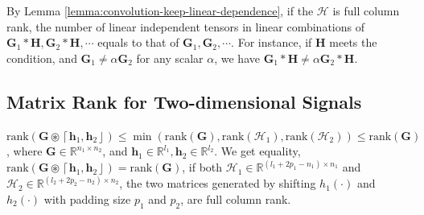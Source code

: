 \documentclass[twoside,11pt]{article}
\def\oconv{\circledast}
\def\rank{\text{rank}}
\def\tvar#1{\mathbf{#1}} %
\def\lcerfl#1{\left\lceil{#1}\right\rfloor}
\begin{document}
  By Lemma \ref{lemma:convolution-keep-linear-dependence}, if the \(\mathcal{H}\) is full column rank, the number of linear independent tensors in linear combinations of \(\tvar{G}_1 * \tvar{H}, \tvar{G}_2 * \tvar{H}, \cdots\) equals to that of \(\tvar{G}_1, \tvar{G}_2, \cdots\).
  For instance, if \(\tvar{H}\) meets the condition, and \(\tvar{G}_1 \ne \alpha \tvar{G}_2\) for any scalar \(\alpha\), we have \(\tvar{G}_1 * \tvar{H} \ne \alpha \tvar{G}_2 * \tvar{H}\).

\subsection{Matrix Rank for Two-dimensional Signals}
\label{subsec:matrix-rank-for-two-dimensional-signals}

\begin{lemma}
  \(\rank(\tvar{G} \oconv \lcerfl{\tvar{h}_1, \tvar{h}_2}) \le \min\left(\rank(\tvar{G}), \rank(\mathcal{H}_1), \rank(\mathcal{H}_2)\right) \le \rank(\tvar{G})\), where \(\tvar{G} \in \mathbb{R}^{n_1 \times n_2}\), and \(\tvar{h}_1 \in \mathbb{R}^{l_1}, \tvar{h}_2 \in \mathbb{R}^{l_2}\).
    We get equality, \(\rank(\tvar{G} \oconv \lcerfl{\tvar{h}_1, \tvar{h}_2}) = \rank(\tvar{G})\), if both \(\mathcal{H}_1 \in \mathbb{R}^{(l_1 + 2p_1 -n_1) \times n_1}\) and \(\mathcal{H}_2 \in \mathbb{R}^{(l_2 + 2p_2 -n_2) \times n_2}\), the two matrices generated by shifting \(h_1(\cdot)\) and \(h_2(\cdot)\) with padding size \(p_1\) and \(p_2\), are full column rank.
  \label{lemma:rank-oconv-g-h-h-is-rank-g}
\end{lemma}
\end{document}
